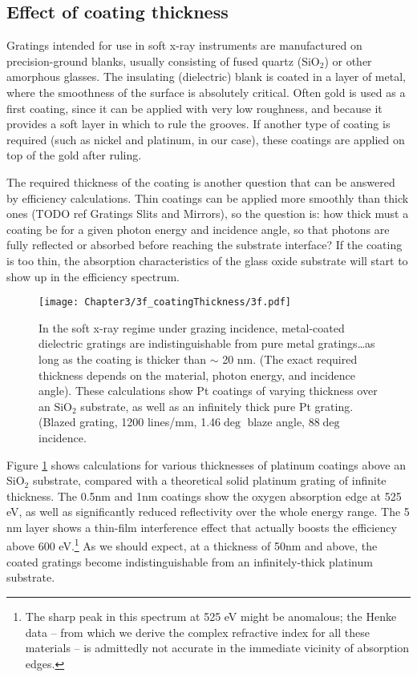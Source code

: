\subsection{Effect of coating thickness}
Gratings intended for use in soft x-ray instruments are manufactured on precision-ground  blanks, usually consisting of fused quartz (SiO$_2$) or other amorphous glasses.  The insulating (dielectric) blank is coated in a layer of metal, where the smoothness of the surface is absolutely critical.  Often gold is used as a first coating, since it can be applied with very low roughness, and because it provides a soft layer in which to rule the grooves.  If another type of coating is required (such as nickel and platinum, in our case), these coatings are applied on top of the gold after ruling.

The required thickness of the coating is another question that can be answered by efficiency calculations.   Thin coatings can be applied more smoothly than thick ones (TODO ref Gratings Slits and Mirrors), so the question is: how thick must a coating be for a given photon energy and incidence angle, so that photons are fully reflected or absorbed before reaching the substrate interface?  If the coating is too thin, the absorption characteristics of the glass oxide substrate will start to show up in the efficiency spectrum.

\begin{figure}[htbp] %
   \centering
   \texttt{[image: Chapter3/3f\_coatingThickness/3f.pdf]} 
   \caption[In the soft x-ray regime under grazing incidence, metal-coated dielectric gratings are indistinguishable from pure metal gratings\ldots as long as the coating is thicker than $\sim$ 20 nm.]{In the soft x-ray regime under grazing incidence, metal-coated dielectric gratings are indistinguishable from pure metal gratings\ldots as long as the coating is thicker than $\sim$ 20 nm.  (The exact required thickness depends on the material, photon energy, and incidence angle).  These calculations show Pt coatings of varying thickness over an SiO$_2$ substrate, as well as an infinitely thick pure Pt grating.  (Blazed grating, 1200 lines/mm, 1.46$\deg$ blaze angle, 88$\deg$ incidence.}
   \label{3f}
\end{figure}

Figure \ref{3f} shows calculations for various thicknesses of platinum coatings above an SiO$_2$ substrate, compared with a theoretical solid platinum grating of infinite thickness.  The 0.5nm and 1nm coatings show the oxygen absorption edge at 525 eV, as well as significantly reduced reflectivity over the whole energy range.  The 5 nm layer shows a thin-film interference effect that actually boosts the efficiency above 600 eV.\footnote{The sharp peak in this spectrum at 525 eV might be anomalous; the Henke data -- from which we derive the complex refractive index for all these materials -- is admittedly not accurate in the immediate vicinity of absorption edges.}  As we should expect, at a thickness of 50nm and above, the coated gratings become indistinguishable from an infinitely-thick platinum substrate.  

